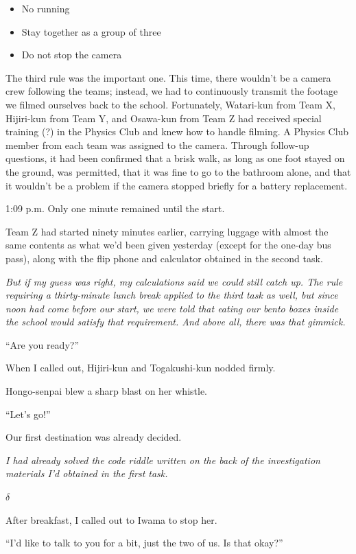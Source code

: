 \documentclass[
    a4paper,
    12pt,
    twoside,
    openany,
    UTF8,
    fontset=windows
]{ctexbook}
\begin{document}
\begin{itemize}
\item No running
\item Stay together as a group of three
\item Do not stop the camera
\end{itemize}

The third rule was the important one. This time, there wouldn't be a camera crew following the teams; instead, we had to continuously transmit the footage we filmed ourselves back to the school. Fortunately, Watari-kun from Team X, Hijiri-kun from Team Y, and Osawa-kun from Team Z had received special training (?) in the Physics Club and knew how to handle filming. A Physics Club member from each team was assigned to the camera. Through follow-up questions, it had been confirmed that a brisk walk, as long as one foot stayed on the ground, was permitted, that it was fine to go to the bathroom alone, and that it wouldn't be a problem if the camera stopped briefly for a battery replacement.

1:09 p.m. Only one minute remained until the start.

Team Z had started ninety minutes earlier, carrying luggage with almost the same contents as what we'd been given yesterday (except for the one-day bus pass), along with the flip phone and calculator obtained in the second task.

\textit{But if my guess was right, my calculations said we could still catch up. The rule requiring a thirty-minute lunch break applied to the third task as well, but since noon had come before our start, we were told that eating our bento boxes inside the school would satisfy that requirement. And above all, there was that gimmick.}

``Are you ready?''

When I called out, Hijiri-kun and Togakushi-kun nodded firmly.

Hongo-senpai blew a sharp blast on her whistle.

``Let's go!''

Our first destination was already decided.

\textit{I had already solved the code riddle written on the back of the investigation materials I'd obtained in the first task.}

$\delta$

After breakfast, I called out to Iwama to stop her.

``I'd like to talk to you for a bit, just the two of us. Is that okay?''
\end{document}
